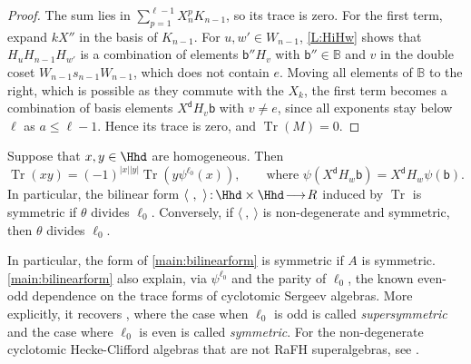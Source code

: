 \documentclass[a4paper,11pt]{amsart}
\def\map#1#2{\,{:}\,#1\!\longrightarrow\!#2}
\let\<\langle
\let\>\rangle
\newcommand{\Tr}{\op{Tr}}
\numberwithin{equation}{subsection}
\theoremstyle{definition}
\theoremstyle{theorem}
\theoremstyle{remark}
\newcommand\Sym{W}
\newcommand\Kr[1]{K_{#1}}
\newcommand\bd{\mathsf{d}}
\newcommand\bb{\mathsf{b}}
\newcommand\op{\operatorname}
\newcommand{\Bo}{\mathbb{B}}
\begin{document}
\begin{proof}
The sum lies in $\sum_{p=1}^{\ell-1}X_n^p\Kr{n-1}$, so its trace is zero. For the first term, expand $kX''$ in the basis of $\Kr{n-1}$. For $u,w'\in\Sym_{n-1}$, \autoref{L:HiHw} shows that $H_uH_{n-1}H_{w'}$ is a combination of elements $\bb''H_v$ with $\bb''\in\Bo$ and $v$ in the double coset $\Sym_{n-1}s_{n-1}\Sym_{n-1}$, which does not contain $e$. Moving all elements of $\Bo$ to the right, which is possible as they commute with the $X_k$, the first term becomes a combination of basis elements $X^{\bd}H_v\bb$ with $v\neq e$, since all exponents stay below $\ell$ as $a\le\ell-1$. Hence its trace is zero, and $\Tr(M)=0$.
\end{proof}


 \begin{Theorem}\label{main:bilinearform}
Suppose that $x,y\in\Hhd$ are homogeneous. Then
\begin{equation*}
\Tr(xy)=(-1)^{|x||y|}\Tr(y\psi^{\ell_0}(x)),
\qquad\text{where $\psi(X^\bd H_w\bb)=X^\bd H_w\psi(\bb)$.}
\end{equation*}
In particular, the bilinear form $\<\ ,\ \>\map{\Hhd\times\Hhd} R$
induced by $\Tr$ is symmetric if $\theta$ divides $\ell_0$. Conversely,
if $\<\ ,\ \>$ is non-degenerate and symmetric, then $\theta$ divides
$\ell_0$.
\end{Theorem}

\begin{Remark}
In particular, the form of \autoref{main:bilinearform} is symmetric if
$A$ is symmetric. \autoref{main:bilinearform} also explain, via
$\psi^{\ell_0}$ and the parity of $\ell_0$, the known even-odd
dependence on the trace forms of cyclotomic Sergeev algebras. More
explicitly, it recovers \cite[Theorem~1.2]{LiShi:SergeevCocenter}, where
the case when $\ell_0$ is odd is called \emph{supersymmetric} and the
case where $\ell_0$ is even is called \emph{symmetric}. For the
non-degenerate cyclotomic Hecke-Clifford algebras that are not RaFH
superalgebras, see \cite{LiShi:QuiverHeckeClifford}.
\end{Remark}
\end{document}
